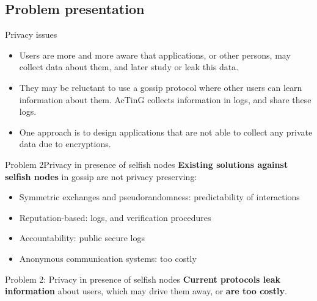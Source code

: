 \documentclass[10pt]{beamer}
\begin{document}
\subsection{Problem presentation}

\begin{frame}{Privacy issues}{}
   \begin{itemize}
      \item Users are more and more aware that applications, or other persons, may collect data about them, and later study or leak this data. 
\vspace{5mm}
      \item They may be reluctant to use a gossip protocol where other users can learn information about them. AcTinG collects information in logs, and share these logs. 
\vspace{5mm}      
      \item One approach is to design applications that are not able to collect any private data due to encryptions. 
   \end{itemize}
\end{frame}

\begin{frame}{Problem 2}{Privacy in presence of selfish nodes}
      \textbf{Existing solutions against selfish nodes} in gossip are not privacy preserving:
         \begin{itemize}
            \item Symmetric exchanges and pseudorandomness: predictability of interactions
            \item Reputation-based: logs, and verification procedures
            \item Accountability: public secure logs
            \item Anonymous communication systems: too costly 
         \end{itemize}
 
  \begin{block}{Problem 2: Privacy in presence of selfish nodes}
     \textbf{Current protocols leak information} about users, which may drive them away, or \textbf{are too costly}.
  \end{block}
 
\end{frame}
\end{document}
